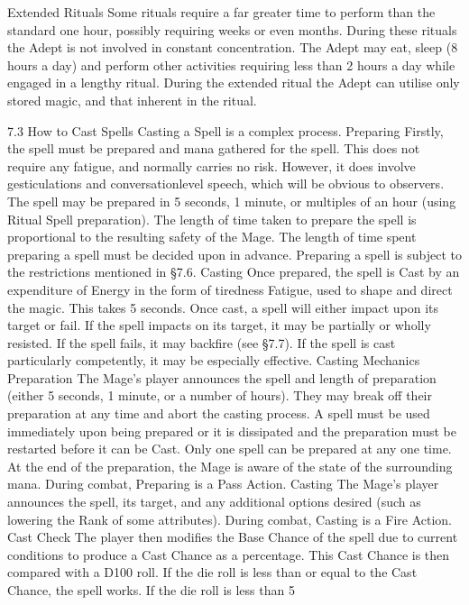 \documentclass[a4paper]{article}
\begin{document}
\begin{multicols}{3}
Extended Rituals
Some rituals require a far greater time to perform
than the standard one hour, possibly requiring
weeks or even months. During these rituals the
Adept is not involved in constant concentration.
The Adept may eat, sleep (8 hours a day) and perform other activities requiring less than 2 hours a
day while engaged in a lengthy ritual. During the
extended ritual the Adept can utilise only stored
magic, and that inherent in the ritual.

7.3 How to Cast Spells
Casting a Spell is a complex process.
Preparing Firstly, the spell must be prepared and
mana gathered for the spell. This does not require
any fatigue, and normally carries no risk. However,
it does involve gesticulations and conversationlevel speech, which will be obvious to observers.
The spell may be prepared in 5 seconds, 1 minute,
or multiples of an hour (using Ritual Spell preparation). The length of time taken to prepare the spell
is proportional to the resulting safety of the Mage.
The length of time spent preparing a spell must be
decided upon in advance. Preparing a spell is subject to the restrictions mentioned in §7.6.
Casting Once prepared, the spell is Cast by an
expenditure of Energy in the form of tiredness
Fatigue, used to shape and direct the magic. This
takes 5 seconds. Once cast, a spell will either impact upon its target or fail. If the spell impacts on
its target, it may be partially or wholly resisted. If
the spell fails, it may backfire (see §7.7). If the
spell is cast particularly competently, it may be
especially effective.
Casting Mechanics
Preparation The Mage’s player announces the
spell and length of preparation (either 5 seconds, 1
minute, or a number of hours). They may break off
their preparation at any time and abort the casting
process. A spell must be used immediately upon
being prepared or it is dissipated and the preparation must be restarted before it can be Cast. Only
one spell can be prepared at any one time. At the
end of the preparation, the Mage is aware of the
state of the surrounding mana. During combat,
Preparing is a Pass Action.
Casting The Mage’s player announces the spell, its
target, and any additional options desired (such as
lowering the Rank of some attributes). During
combat, Casting is a Fire Action.
Cast Check The player then modifies the Base
Chance of the spell due to current conditions to
produce a Cast Chance as a percentage. This Cast
Chance is then compared with a D100 roll. If the
die roll is less than or equal to the Cast Chance, the
spell works. If the die roll is less than 5%

\end{multicols}
\end{document}
